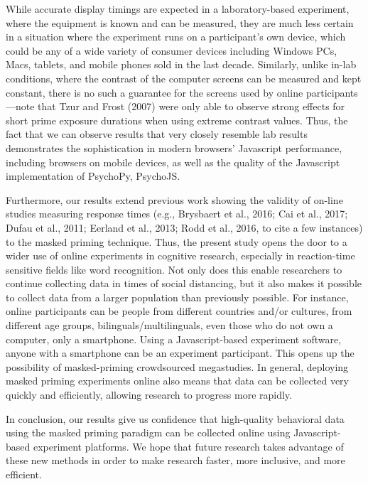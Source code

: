 \documentclass[
  english,
  man,floatsintext]{apa6}
\begin{document}
While accurate display timings are expected in a laboratory-based experiment, where the equipment is known and can be measured, they are much less certain in a situation where the experiment runs on a participant's own device, which could be any of a wide variety of consumer devices including Windows PCs, Macs, tablets, and mobile phones sold in the last decade. Similarly, unlike in-lab conditions, where the contrast of the computer screens can be measured and kept constant, there is no such a guarantee for the screens used by online participants---note that Tzur and Frost (2007) were only able to observe strong effects for short prime exposure durations when using extreme contrast values. Thus, the fact that we can observe results that very closely resemble lab results demonstrates the sophistication in modern browsers' Javascript performance, including browsers on mobile devices, as well as the quality of the Javascript implementation of PsychoPy, PsychoJS.

Furthermore, our results extend previous work showing the validity of on-line studies measuring response times (e.g., Brysbaert et al., 2016; Cai et al., 2017; Dufau et al., 2011; Eerland et al., 2013; Rodd et al., 2016, to cite a few instances) to the masked priming technique. Thus, the present study opens the door to a wider use of online experiments in cognitive research, especially in reaction-time sensitive fields like word recognition. Not only does this enable researchers to continue collecting data in times of social distancing, but it also makes it possible to collect data from a larger population than previously possible. For instance, online participants can be people from different countries and/or cultures, from different age groups, bilinguals/multilinguals, even those who do not own a computer, only a smartphone. Using a Javascript-based experiment software, anyone with a smartphone can be an experiment participant. This opens up the possibility of masked-priming crowdsourced megastudies. In general, deploying masked priming experiments online also means that data can be collected very quickly and efficiently, allowing research to progress more rapidly.

In conclusion, our results give us confidence that high-quality behavioral data using the masked priming paradigm can be collected online using Javascript-based experiment platforms. We hope that future research takes advantage of these new methods in order to make research faster, more inclusive, and more efficient.
\end{document}
